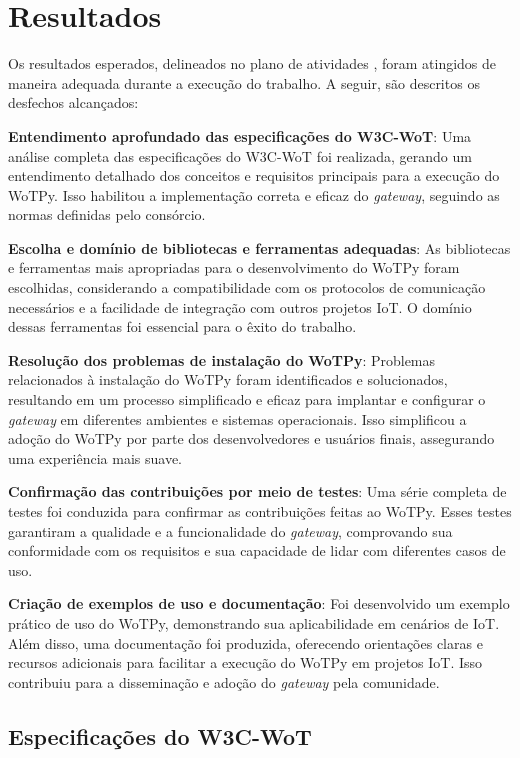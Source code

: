 \chapter{Resultados}

Os resultados esperados, delineados no plano de atividades , foram atingidos de maneira adequada durante a execução do trabalho. A seguir, são descritos os desfechos alcançados:

\textbf{Entendimento aprofundado das especificações do W3C-WoT}: Uma análise completa das especificações do W3C-WoT foi realizada, gerando um entendimento detalhado dos conceitos e requisitos principais para a execução do WoTPy. Isso habilitou a implementação correta e eficaz do \textit{gateway}, seguindo as normas definidas pelo consórcio.

\textbf{Escolha e domínio de bibliotecas e ferramentas adequadas}: As bibliotecas e ferramentas mais apropriadas para o desenvolvimento do WoTPy foram escolhidas, considerando a compatibilidade com os protocolos de comunicação necessários e a facilidade de integração com outros projetos IoT. O domínio dessas ferramentas foi essencial para o êxito do trabalho.

\textbf{Resolução dos problemas de instalação do WoTPy}: Problemas relacionados à instalação do WoTPy foram identificados e solucionados, resultando em um processo simplificado e eficaz para implantar e configurar o \textit{gateway} em diferentes ambientes e sistemas operacionais. Isso simplificou a adoção do WoTPy por parte dos desenvolvedores e usuários finais, assegurando uma experiência mais suave.

\textbf{Confirmação das contribuições por meio de testes}: Uma série completa de testes foi conduzida para confirmar as contribuições feitas ao WoTPy. Esses testes garantiram a qualidade e a funcionalidade do \textit{gateway}, comprovando sua conformidade com os requisitos e sua capacidade de lidar com diferentes casos de uso.

\textbf{Criação de exemplos de uso e documentação}: Foi desenvolvido um exemplo prático de uso do WoTPy, demonstrando sua aplicabilidade em cenários de IoT. Além disso, uma documentação foi produzida, oferecendo orientações claras e recursos adicionais para facilitar a execução do WoTPy em projetos IoT. Isso contribuiu para a disseminação e adoção do \textit{gateway} pela comunidade.

\section{Especificações do W3C-WoT}

